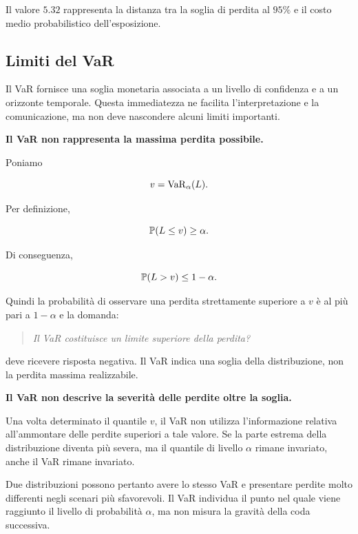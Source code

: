 Il valore $5.32$ rappresenta la distanza tra la soglia di perdita al
$95\%$ e il costo medio probabilistico dell'esposizione.

\subsection{Limiti del VaR}

\label{subsec:cap9-limiti-var}

Il VaR fornisce una soglia monetaria associata a un livello di
confidenza e a un orizzonte temporale. Questa immediatezza ne facilita
l'interpretazione e la comunicazione, ma non deve nascondere alcuni
limiti importanti.

\medskip

\noindent
\textbf{Il VaR non rappresenta la massima perdita possibile.}

Poniamo

\[
v=\operatorname{VaR}_{\alpha}(L).
\]

Per definizione,

\[
\mathbb{P}(L\leq v)\geq\alpha.
\]

Di conseguenza,

\[
\mathbb{P}(L>v)\leq 1-\alpha.
\]

Quindi la probabilit\`{a} di osservare una perdita strettamente superiore
a $v$ \`{e} al pi\`{u} pari a $1-\alpha$ e la domanda:

\begin{quote}
\emph{Il VaR costituisce un limite superiore della perdita?}
\end{quote}

\noindent deve ricevere risposta negativa. Il VaR indica una soglia della
distribuzione, non la perdita massima realizzabile.

\medskip

\noindent
\textbf{Il VaR non descrive la severit\`{a} delle perdite oltre la
soglia.}

Una volta determinato il quantile $v$, il VaR non utilizza
l'informazione relativa all'ammontare delle perdite superiori a tale
valore. Se la parte estrema della distribuzione diventa pi\`{u} severa,
ma il quantile di livello $\alpha$ rimane invariato, anche il VaR
rimane invariato.

Due distribuzioni possono pertanto avere lo stesso VaR e presentare
perdite molto differenti negli scenari pi\`{u} sfavorevoli. Il VaR
individua il punto nel quale viene raggiunto il livello di probabilit\`{a}
$\alpha$, ma non misura la gravit\`{a} della coda successiva.

